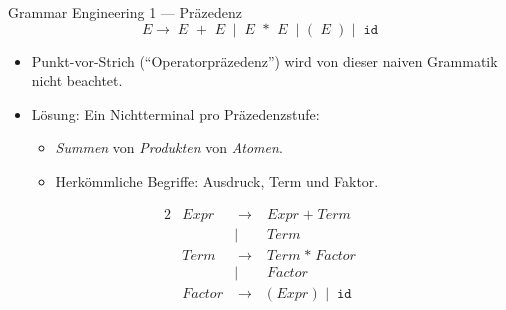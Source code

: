 \documentclass{beamer}
\begin{document}
\begin{frame}{Grammar Engineering 1 --- Präzedenz}
  \begin{equation*}
    E \to \; E \;\; \texttt{+} \;\; E \;
     \mid \; E \;\; \texttt{*} \;\; E \;
     \mid \; \texttt{(} \;\; E \;\; \texttt{)} \;
     \mid \; \texttt{id}
  \end{equation*}

  \begin{itemize}
    \item Punkt-vor-Strich (\enquote{Operatorpräzedenz}) wird von dieser naiven Grammatik nicht beachtet.
    \item Lösung: Ein Nichtterminal pro Präzedenzstufe:
    \begin{itemize}
      \item \emph{Summen} von \emph{Produkten} von \emph{Atomen}.
      \item Herkömmliche Begriffe: Ausdruck, Term und Faktor.
    \end{itemize}
  \end{itemize}

  \begin{alignat*}{2}
    & Expr   & \; \to \; & Expr \; \texttt{+} \; Term \\
          && \mid \;\; & Term \\
    & Term   & \; \to \; & Term \; \texttt{*} \; Factor \\
            && \mid \;\; & Factor \\
    & Factor & \; \to \; & \texttt{(} \; Expr \; \texttt{)} \; \mid \; \texttt{id}
  \end{alignat*}
\end{frame}
\end{document}
